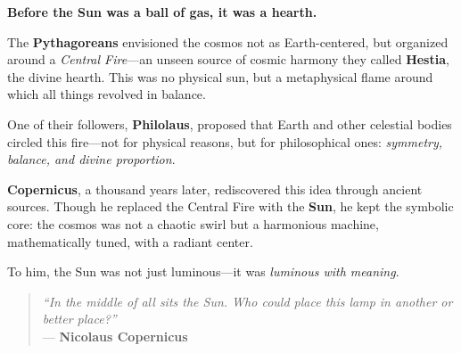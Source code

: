 \begin{tcolorbox}[title=The Sun as a Divine Center, colback=gray!5, colframe=black, fonttitle=\bfseries]

  \textbf{Before the Sun was a ball of gas, it was a hearth.}
  
  The \textbf{Pythagoreans} envisioned the cosmos not as Earth-centered, but organized around a \textit{Central Fire}—an unseen source of cosmic harmony they called \textbf{Hestia}, the divine hearth. This was no physical sun, but a metaphysical flame around which all things revolved in balance.
  
  One of their followers, \textbf{Philolaus}, proposed that Earth and other celestial bodies circled this fire—not for physical reasons, but for philosophical ones: \textit{symmetry, balance, and divine proportion}.
  
  \textbf{Copernicus}, a thousand years later, rediscovered this idea through ancient sources. Though he replaced the Central Fire with the \textbf{Sun}, he kept the symbolic core: the cosmos was not a chaotic swirl but a harmonious machine, mathematically tuned, with a radiant center.
  
  To him, the Sun was not just luminous—it was \textit{luminous with meaning}.
  
  \begin{quote}
  \textit{“In the middle of all sits the Sun. Who could place this lamp in another or better place?”} \\
  — \textbf{Nicolaus Copernicus}
  \end{quote}
  
\end{tcolorbox}

